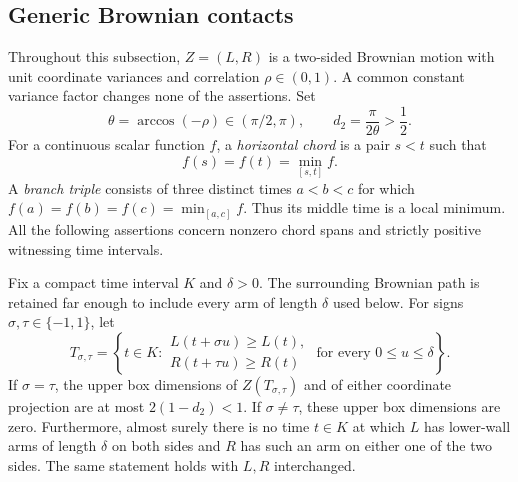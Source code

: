 \subsection{Generic Brownian contacts}

Throughout this subsection, $Z=(L,R)$ is a two-sided Brownian motion with
unit coordinate variances and correlation $\rho\in(0,1)$.  A common constant
variance factor changes none of the assertions.  Set
\[
 \theta=\arccos(-\rho)\in(\pi/2,\pi),\qquad
 d_2=\frac{\pi}{2\theta}>\frac12.
\]
For a continuous scalar function $f$, a \emph{horizontal chord} is a pair
$s<t$ such that
\[
 f(s)=f(t)=\min_{[s,t]}f.
\]
A \emph{branch triple} consists of three distinct times $a<b<c$ for which
$f(a)=f(b)=f(c)=\min_{[a,c]}f$.  Thus its middle time is a local minimum.
All the following assertions concern nonzero chord spans and strictly
positive witnessing time intervals.

\begin{lemma}\label{arm:record-height-images}
Fix a compact time interval $K$ and $\delta>0$.  The surrounding Brownian
path is retained far enough to include every arm of length $\delta$ used
below.  For signs $\sigma,\tau\in\{-1,1\}$, let
\[
 T_{\sigma,\tau}=
 \left\{t\in K:
 \begin{array}{l}
 L(t+\sigma u)\ge L(t),\\
 R(t+\tau u)\ge R(t)
 \end{array}
 \text{ for every }0\le u\le\delta\right\}.
\]
If $\sigma=\tau$, the upper box dimensions of $Z(T_{\sigma,\tau})$
and of either coordinate projection are at most $2(1-d_2)<1$.
If $\sigma\ne\tau$, these upper box dimensions are zero.
Furthermore, almost surely there is no time $t\in K$ at which $L$ has
lower-wall arms of length $\delta$ on both sides and $R$ has such an arm
on either one of the two sides.  The same statement holds with $L,R$
interchanged.
\end{lemma}

